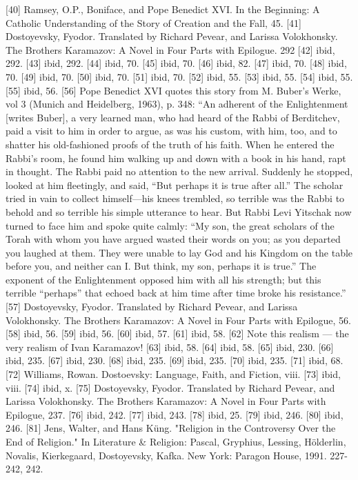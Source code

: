 [40] Ramsey, O.P., Boniface, and Pope Benedict XVI. In the Beginning: A Catholic Understanding of the Story of Creation and the Fall, 45.
[41] Dostoyevsky, Fyodor. Translated by Richard Pevear, and Larissa Volokhonsky. The Brothers Karamazov: A Novel in Four Parts with Epilogue. 292
[42] ibid, 292.
[43] ibid, 292.
[44] ibid, 70.
[45] ibid, 70.
[46] ibid, 82.
[47] ibid, 70.
[48] ibid, 70.
[49] ibid, 70.
[50] ibid, 70.
[51] ibid, 70.
[52] ibid, 55.
[53] ibid, 55.
[54] ibid, 55.
[55] ibid, 56.
[56] Pope Benedict XVI quotes this story from M. Buber’s Werke, vol 3 (Munich and Heidelberg, 1963), p. 348: “An adherent of the Enlightenment [writes Buber], a very learned man, who had heard of the Rabbi of Berditchev, paid a visit to him in order to argue, as was his custom, with him, too, and to shatter his old-fashioned proofs of the truth of his faith. When he entered the Rabbi’s room, he found him walking up and down with a book in his hand, rapt in thought. The Rabbi paid no attention to the new arrival. Suddenly he stopped, looked at him fleetingly, and said, “But perhaps it is true after all.” The scholar tried in vain to collect himself—his knees trembled, so terrible was the Rabbi to behold and so terrible his simple utterance to hear. But Rabbi Levi Yitschak now turned to face him and spoke quite calmly: “My son, the great scholars of the Torah with whom you have argued wasted their words on you; as you departed you laughed at them. They were unable to lay God and his Kingdom on the table before you, and neither can I. But think, my son, perhaps it is true.” The exponent of the Enlightenment opposed him with all his strength; but this terrible “perhaps” that echoed back at him time after time broke his resistance.”
[57] Dostoyevsky, Fyodor. Translated by Richard Pevear, and Larissa Volokhonsky. The Brothers Karamazov: A Novel in Four Parts with Epilogue, 56.
[58] ibid, 56.
[59] ibid, 56.
[60] ibid, 57.
[61] ibid, 58.
[62] Note this realism — the very realism of Ivan Karamazov!
[63] ibid, 58.
[64] ibid, 58.
[65] ibid, 230.
[66] ibid, 235.
[67] ibid, 230.
[68] ibid, 235.
[69] ibid, 235.
[70] ibid, 235.
[71] ibid, 68.
[72] Williams, Rowan. Dostoevsky: Language, Faith, and Fiction, viii.
[73] ibid, viii.
[74] ibid, x.
[75] Dostoyevsky, Fyodor. Translated by Richard Pevear, and Larissa Volokhonsky. The Brothers Karamazov: A Novel in Four Parts with Epilogue, 237.
[76] ibid, 242.
[77] ibid, 243.
[78] ibid, 25.
[79] ibid, 246.
[80] ibid, 246.
[81] Jens, Walter, and Hans Küng. "Religion in the Controversy Over the End of Religion." In Literature & Religion: Pascal, Gryphius, Lessing, Hölderlin, Novalis, Kierkegaard, Dostoyevsky, Kafka. New York: Paragon House, 1991. 227-242, 242.
